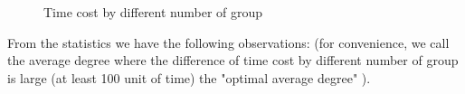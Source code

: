 \begin{figure} [H]
    \hspace{1in} 
    \hspace{1in} 
    \hspace{1in} 
    \caption{Time cost by different number of group} 
  \label{fig:Final} %
\end{figure}  

From the statistics we have the following observations: (for convenience, we call the average degree where the difference of time cost by different number of group is large (at least 100 unit of time) the "optimal average degree" ).   
 
